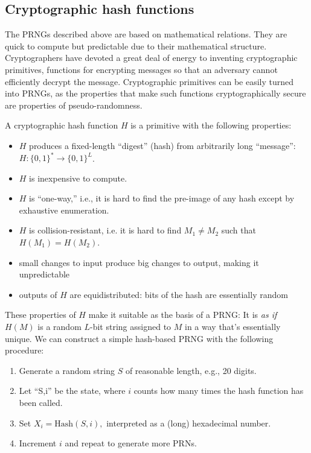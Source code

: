 \documentclass[graybox]{svmult}
\begin{document}
\subsection{Cryptographic hash functions}
The PRNGs described above are based on mathematical relations.
They are quick to compute but predictable due to their mathematical structure.
Cryptographers have devoted a great deal of energy to inventing cryptographic primitives,
functions for encrypting messages so that an adversary cannot efficiently decrypt the message.
Cryptographic primitives can be easily turned into PRNGs, as the properties that make such functions cryptographically secure
are properties of pseudo-randomness.

A cryptographic hash function $H$ is a primitive with the following properties:

\begin{itemize}
\item $H$ produces a fixed-length ``digest'' (hash) from arbitrarily long ``message'': $H:\{0, 1\}^* \rightarrow \{0, 1\}^L$.
\item $H$ is inexpensive to compute.
\item $H$ is ``one-way,'' i.e., it is hard to find the pre-image of any hash except by exhaustive enumeration.
\item $H$ is collision-resistant, i.e. it is hard to find $M_1 \ne M_2$ such that $H(M_1) = H(M_2)$.
\item small changes to input produce big changes to output, making it unpredictable
\item outputs of $H$ are equidistributed: bits of the hash are essentially random 
\end{itemize}

These properties of $H$ make it suitable as the basis of a PRNG:
It is \emph{as if} $H(M)$ is a random $L$-bit string assigned to $M$ in a way that's essentially unique.
We can construct a simple hash-based PRNG with the following procedure:

\begin{enumerate}
\item Generate a random string $S$ of reasonable length, e.g., 20 digits.
\item Let ``S,i'' be the state, where $i$ counts how many times the hash function has been called.
\item Set $X_i = {\mbox{Hash}}(S,i),$ interpreted as a (long) hexadecimal number.
\item Increment $i$ and repeat to generate more PRNs.
\end{enumerate}
\end{document}
